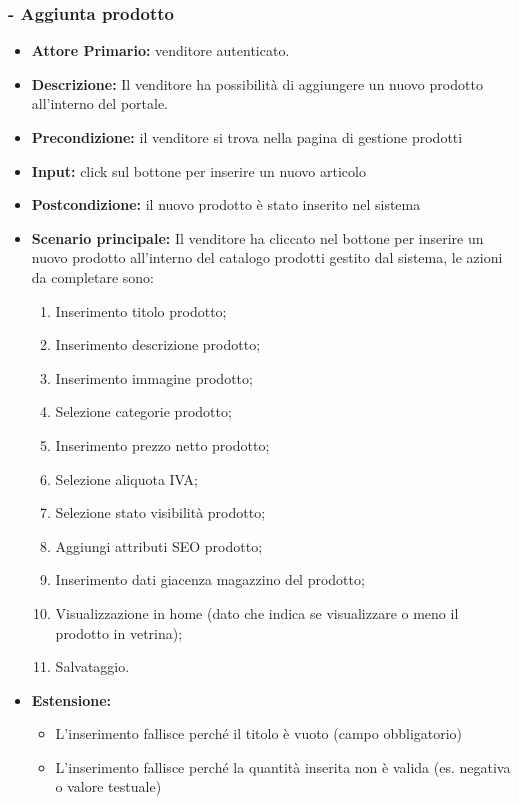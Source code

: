 \subsubsection{- Aggiunta prodotto}
\begin{itemize}
    \item \textbf{Attore Primario:}  venditore autenticato.
    \item \textbf{Descrizione:} Il venditore ha possibilità di aggiungere un nuovo prodotto all’interno del portale.
    \item \textbf{Precondizione:} il venditore si trova nella pagina di gestione prodotti
    \item \textbf{Input:} click sul bottone per inserire un nuovo articolo
    \item \textbf{Postcondizione:} il nuovo prodotto è stato inserito nel sistema
    \item \textbf{Scenario principale:} Il venditore ha cliccato nel bottone per inserire un nuovo prodotto all’interno del catalogo prodotti gestito dal sistema, le azioni da completare sono: 
    \begin{enumerate}
        \item Inserimento titolo prodotto;
        \item Inserimento descrizione prodotto;
        \item Inserimento immagine prodotto;
        \item Selezione categorie prodotto;
        \item Inserimento prezzo netto prodotto;
        \item Selezione aliquota IVA;
        \item Selezione stato visibilità prodotto; 
        \item Aggiungi attributi SEO prodotto;
        \item Inserimento dati giacenza magazzino del prodotto;
        \item Visualizzazione in home (dato che indica se visualizzare o meno il prodotto in vetrina);
        \item Salvataggio.
    \end{enumerate}
    \item \textbf{Estensione:}
    \begin{itemize}
        \item L'inserimento fallisce perché il titolo è vuoto (campo obbligatorio) 
        \item L'inserimento fallisce perché la quantità inserita non è valida (es. negativa o valore testuale)
    \end{itemize}
\end{itemize}

